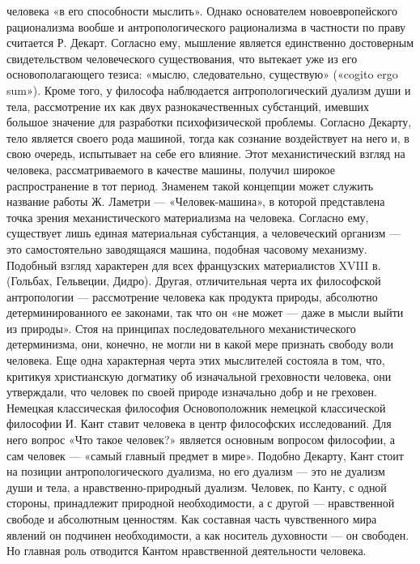 \documentclass[12pt]{article}
\begin{document}
человека «в его способности мыслить».
Однако основателем новоевропейского рационализма вообше и антропологического рационализма в частности 
по праву считается Р. Декарт. Согласно ему, мышление является единственно достоверным свидетельством
человеческого существования, что вытекает уже из его основополагающего тезиса: «мыслю, следовательно,
существую» («cogito ergo sum»). Кроме того, у философа наблюдается антропологический дуализм души и тела,
рассмотрение  их  как  двух  разнокачественных  субстанций,  имевших  большое  значение  для  разработки
психофизической  проблемы.  Согласно  Декарту,  тело  является  своего  рода  машиной,  тогда  как  сознание
воздействует на него и, в свою очередь, испытывает на себе его влияние.
Этот  механистический  взгляд  на  человека,  рассматриваемого  в  качестве  машины,  получил  широкое
распространение в тот период. Знаменем такой концепции может служить название работы Ж. Ламетри —
«Человек-машина»,  в  которой  представлена  точка  зрения  механистического  материализма  на  человека.
Согласно  ему,  существует  лишь  единая  материальная  субстанция,  а  человеческий  организм  —  это
самостоятельно заводящаяся машина, подобная часовому механизму.
Подобный взгляд характерен для всех французских материалистов XVIII в. (Гольбах, Гельвеции, Дидро).
Другая, отличительная черта их философской антропологии — рассмотрение человека как продукта природы,
абсолютно детерминированного ее законами, так что он «не может — даже в мысли выйти из природы». Стоя на
принципах  последовательного  механистического  детерминизма,  они,  конечно,  не  могли  ни  в  какой  мере
признать свободу воли человека. Еще одна характерная черта этих мыслителей состояла в том, что, критикуя
христианскую догматику об изначальной греховности человека, они утверждали, что человек по своей природе
изначально добр и не греховен.
Немецкая классическая философия
Основоположник  немецкой  классической  философии  И.  Кант  ставит  человека  в  центр  философских
исследований. Для него вопрос «Что такое человек?» является основным вопросом философии, а сам человек
— «самый главный предмет в мире». Подобно Декарту, Кант стоит на позиции антропологического дуализма,
но его дуализм — это не дуализм души и тела, а нравственно-природный дуализм. Человек, по Канту, с одной
стороны,  принадлежит  природной  необходимости,  а  с  другой  —  нравственной  свободе  и  абсолютным
ценностям.  Как  составная  часть  чувственного  мира  явлений  он  подчинен  необходимости,  а  как  носитель
духовности — он свободен. Но главная роль отводится Кантом нравственной деятельности человека.
\end{document}
